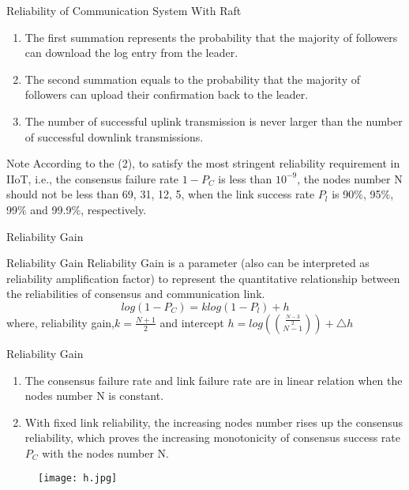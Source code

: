 \documentclass{beamer}
\begin{document}
\begin{frame}{Reliability of Communication System With Raft}
\begin{block}{}
    \begin{enumerate}
     \item 
     The first summation represents the probability that the majority of followers can download the  log entry from the leader.
     \item
     The second summation equals to the probability that the majority of followers can upload their confirmation back to the leader.
     \item
     The number of successful uplink transmission is never larger than the number of successful downlink transmissions.
    \end{enumerate}
\end{block}
\begin{block}{Note}
According to the (2), to satisfy the most stringent reliability requirement in IIoT, i.e., the consensus failure rate $1-P_C$ is less than $10^{-9}$, the nodes number N should not be less than 69, 31, 12, 5, when the link success rate $P_l$ is 90$\%$, 95$\%$, 99$\%$ and 99.9$\%$, respectively.
\end{block}
\end{frame} 
\begin{frame}{Reliability Gain}
\begin{block}{Reliability Gain}
Reliability Gain is a parameter (also can be interpreted as reliability amplification factor) to represent the quantitative relationship between the reliabilities of consensus and communication link.
\begin{equation}
    log(1-P_C)= klog(1-P_l) + h
\end{equation}
where, reliability gain,$k=\frac{N+1}{2}$ and intercept $h=log\left({{\frac{N-3}{2}}\choose{ N-1}}\right)+\triangle h$
\end{block}    
\end{frame}
\begin{frame}{Reliability Gain}
\begin{block}{}
\begin{enumerate}
    \item 
    The consensus failure rate and link failure rate are in linear relation when the nodes number N is constant.
    \item
     With fixed link reliability, the increasing nodes number rises up the consensus reliability, which proves the increasing monotonicity of consensus success rate $P_C$ with the nodes number N.
\end{enumerate}
\end{block}
\begin{figure}
    \centering
    \texttt{[image: h.jpg]}
\end{figure}
\end{frame} 
\end{document}
